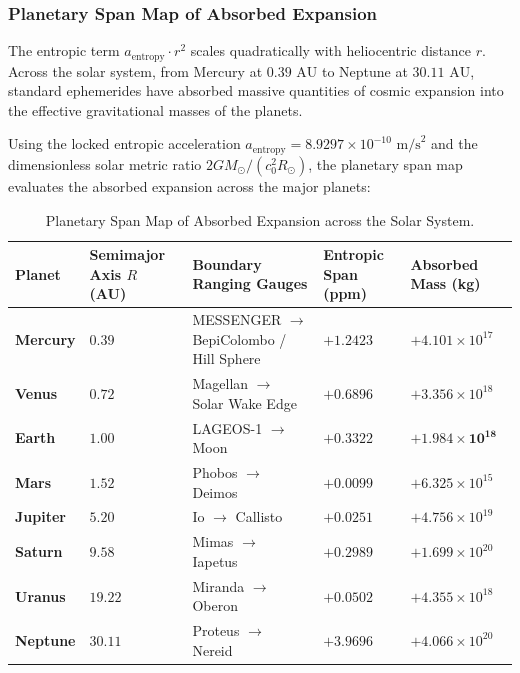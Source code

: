 \documentclass[11pt,a4paper]{article}
\begin{document}
\subsubsection{Planetary Span Map of Absorbed Expansion}
\label{subsubsec:planetary_span_map}

The entropic term $a_{\text{entropy}} \cdot r^2$ scales quadratically with heliocentric distance $r$. Across the solar system, from Mercury at $0.39\text{ AU}$ to Neptune at $30.11\text{ AU}$, standard ephemerides have absorbed massive quantities of cosmic expansion into the effective gravitational masses of the planets.

Using the locked entropic acceleration $a_{\text{entropy}} = 8.9297 \times 10^{-10}\text{ m/s}^2$ and the dimensionless solar metric ratio $2GM_\odot/(c_0^2 R_\odot)$, the planetary span map evaluates the absorbed expansion across the major planets:

\begin{table}[!htbp]
\centering
\caption{Planetary Span Map of Absorbed Expansion across the Solar System.}
\label{tab:planetary_span_map}
\footnotesize
\setlength{\tabcolsep}{4pt}
\renewcommand{\arraystretch}{1.18}
\begin{tabularx}{\textwidth}{L{1.8cm} C{2.4cm} Y C{2.5cm} C{2.8cm}}
\toprule
\textbf{Planet} & \textbf{Semimajor Axis $R$ (AU)} & \textbf{Boundary Ranging Gauges} & \textbf{Entropic Span (ppm)} & \textbf{Absorbed Mass (kg)} \\
\midrule
\textbf{Mercury} & $0.39$ & MESSENGER $\to$ BepiColombo / Hill Sphere & $+1.2423$ & $+4.101 \times 10^{17}$ \\
\textbf{Venus}   & $0.72$ & Magellan $\to$ Solar Wake Edge & $+0.6896$ & $+3.356 \times 10^{18}$ \\
\textbf{Earth}   & $1.00$ & LAGEOS-1 $\to$ Moon & $\mathbf{+0.3322}$ & $\mathbf{+1.984 \times 10^{18}}$ \\
\textbf{Mars}    & $1.52$ & Phobos $\to$ Deimos & $+0.0099$ & $+6.325 \times 10^{15}$ \\
\textbf{Jupiter} & $5.20$ & Io $\to$ Callisto & $+0.0251$ & $+4.756 \times 10^{19}$ \\
\textbf{Saturn}  & $9.58$ & Mimas $\to$ Iapetus & $+0.2989$ & $+1.699 \times 10^{20}$ \\
\textbf{Uranus}  & $19.22$ & Miranda $\to$ Oberon & $+0.0502$ & $+4.355 \times 10^{18}$ \\
\textbf{Neptune} & $30.11$ & Proteus $\to$ Nereid & $+3.9696$ & $+4.066 \times 10^{20}$ \\
\bottomrule
\end{tabularx}
\end{table}
\end{document}
